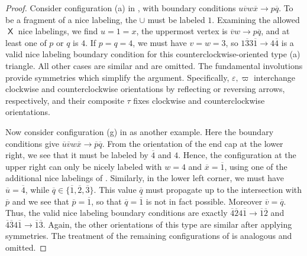 \documentclass{amsart}
\theoremstyle{definition}
\theoremstyle{remark}
\numberwithin{equation}{section}
\DeclareMathOperator{\sfX}{\mathsf{X}}
\begin{document}
\begin{proof}
  Consider configuration (a) in , with boundary conditions $u\overline{v}w\overline{x} \to p\overline{q}$. To be a fragment of a nice labeling, the $\cup$ must be labeled $1$. Examining the allowed $\sfX$ nice labelings, we find $u=1=x$, the uppermost vertex is $\overline{v}w \to p\overline{q}$, and at least one of $p$ or $q$ is $4$. If $p=q=4$, we must have $v=w=3$, so $1\overline{3}3\overline{1} \to 4\overline{4}$ is a valid nice labeling boundary condition for this counterclockwise-oriented type (a) triangle. All other cases are similar and are omitted. The fundamental involutions provide symmetries which simplify the argument. Specifically, $\varepsilon, \varpi$ interchange clockwise and counterclockwise orientations by reflecting or reversing arrows, respectively, and their composite $\tau$ fixes clockwise and counterclockwise orientations.

  Now consider configuration (g) in  as another example. Here the boundary conditions give $\overline{u} \overline{v} w \overline{x} \to \overline{p} \overline{q}$. From the orientation of the end cap at the lower right, we see that it must be labeled by $\overline{4}$ and $4$. Hence, the configuration at the upper right can only be nicely labeled with $w = 4$ and $\overline{x} = \overline{1}$, using one of the additional nice labelings of . Similarly, in the lower left corner, we must have $\overline{u} = \overline{4}$, while $\overline{q} \in \{ \overline{1}, \overline{2}, \overline{3}\}$. This value $\overline{q}$ must propagate up to the intersection with $\overline{p}$ and we see that $\overline{p} = \overline{1}$, so that $\overline{q} = \overline{1}$ is not in fact possible. Moreover $\overline{v} = \overline{q}$. Thus, the valid nice labeling boundary conditions are exactly $\overline{4}\overline{2}4\overline{1} \to \overline{1}\overline{2}$
        and $\overline{4}\overline{3}4\overline{1} \to \overline{1}\overline{3}$.  Again, the other orientations of this type are similar after applying symmetries.
The treatment of the remaining configurations of  is analogous and omitted.
\end{proof}
\end{document}
